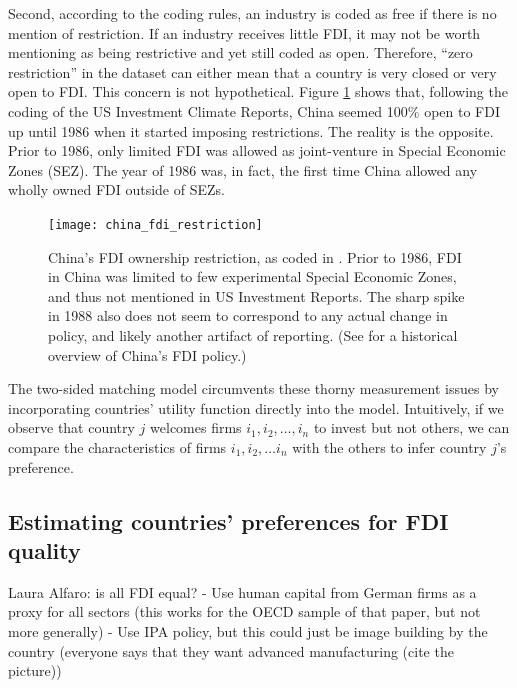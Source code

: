 Second, according to the coding rules, an industry is coded as free if there is
no mention of restriction. If an industry receives little FDI, it may not be
worth mentioning as being restrictive and yet still coded as open. Therefore,
``zero restriction'' in the dataset can either mean that a country is very
closed or very open to FDI. This concern is not hypothetical. Figure
\ref{fig:china_fdi_restriction} shows that, following the coding of the US
Investment Climate Reports, China seemed 100\% open to FDI up until 1986 when it
started imposing restrictions. The reality is the opposite. Prior to 1986, only
limited FDI was allowed as joint-venture in Special Economic Zones (SEZ). The
year of 1986 was, in fact, the first time China allowed any wholly owned FDI
outside of SEZs.

\begin{figure}[!ht] \centering
\texttt{[image: china\_fdi\_restriction]}
\caption[China's FDI ownership restriction.]{China's FDI ownership restriction, as coded in \citet{Pandya2010}.
Prior to 1986, FDI in China was limited to few experimental Special Economic
Zones, and thus not mentioned in US Investment Reports. The sharp spike in 1988
also does not seem to correspond to any actual change in policy, and likely
another artifact of reporting. (See \citet{Zebregs2002} for a historical
overview of China's FDI policy.)}
\label{fig:china_fdi_restriction}
\end{figure}

The two-sided matching model circumvents these thorny measurement issues by
incorporating countries' utility function directly into the model. Intuitively, if we observe
that country $j$ welcomes firms $i_1, i_2, \dots, i_n$ to invest but not others,
we can compare the characteristics of firms $i_1, i_2, \dots i_n$ with the
others to infer country $j$'s preference.

\subsection{Estimating countries' preferences for FDI quality}

Laura Alfaro: is all FDI equal? - Use human capital from German firms as a proxy
for all sectors (this works for the OECD sample of that paper, but not more
generally) - Use IPA policy, but this could just be image building by the
country (everyone says that they want advanced manufacturing (cite the picture))


